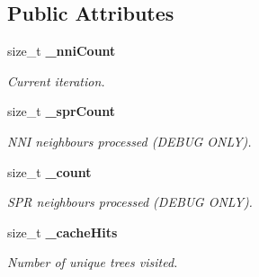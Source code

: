 \subsection*{Public Attributes}
\begin{CompactItemize}
\item 
size\_\-t {\bf \_\-nni\-Count}
\begin{CompactList}\small\item\em Current iteration. \item\end{CompactList}\item 
size\_\-t {\bf \_\-spr\-Count}
\begin{CompactList}\small\item\em NNI neighbours processed (DEBUG ONLY). \item\end{CompactList}\item 
size\_\-t {\bf \_\-count}
\begin{CompactList}\small\item\em SPR neighbours processed (DEBUG ONLY). \item\end{CompactList}\item 
size\_\-t {\bf \_\-cache\-Hits}
\begin{CompactList}\small\item\em Number of unique trees visited. \item\end{CompactList}\end{CompactItemize}
